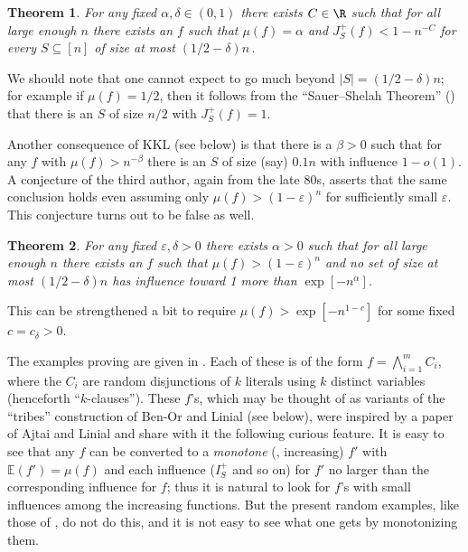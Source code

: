 \documentclass{toc}
\newtheorem{thm}{Theorem}[section]
\newcommand{\mn}[0]{\medskip\noindent}
\newcommand{\nin}[0]{\noindent}
\newcommand{\sub}[0]{\subseteq}
\newcommand{\0}[0]{\emptyset}
\newcommand{\ga}[0]{\alpha }
\newcommand{\gb}[0]{\beta }
\newcommand{\gd}[0]{\delta }
\newcommand{\eps}[0]{\varepsilon }
\begin{document}
%
\begin{thm}\label{prop1}
For any fixed $\ga,\gd \in (0,1)$
%
there exists $C\in\R$ such that for
all   %
large enough $n$
%
there exists 
%
%
%
%
an    %
$f$ such that  
$\mu(f) =\ga$ and $J_S^+(f)<1-n^{-C}$
for every $S\sub [n]$ of size %
%
at most $(1/2-\gd)n\,.$ 
%
%
\end{thm}

\nin
We should note that one cannot expect to go much
beyond $|S|=(1/2-\gd)n$; for example if $\mu(f)  =1/2$,
then it follows from the ``Sauer--Shelah Theorem''
() that there is
an $S$ of size $n/2$ with
$J_S^+(f) = 1$.

Another consequence of KKL (see  below)
is that there is a $\gb>0$ such that for any $f$ with $\mu(f) > n^{-\beta}$
there is an $S$ of size (say) $0.1 n$ with influence $1-o(1)$.
A conjecture of the third author, again from
the late 80s, asserts
that the same conclusion holds even assuming only
$\mu(f) > (1-\eps)^n$
for sufficiently small $\eps$.
This conjecture turns out to be false as well.  %


%
\begin{thm}\label{prop2}
For any fixed $\eps, \gd>0$
%
there exists $\ga > 0$ such that for all large enough $n$
%
there exists an $f$ %
%
such that
$\mu(f) > (1-\eps)^n$ and no set of %
%
size at most $(1/2-\gd)n$   %
%
has influence
%
toward   %
1 more than $\exp[-n^\ga]$.
\end{thm}


\mn
This can be strengthened a bit to require
$\mu(f)  > \exp[-n^{1-c}]$ for some fixed $c=c_\gd>0$.





The examples proving   
are given in .
Each of these is of the form %
$f= \bigwedge_{i=1}^m C_i$,  %
where the %
$C_i$  %
are random %
disjunctions %
of $k$ literals
using $k$ distinct variables (henceforth ``$k$-clauses'').
These $f$'s, %
%
which may be thought of as
variants of the ``tribes''
construction of Ben-Or and Linial
(see below),
were inspired by a paper of
Ajtai and Linial \cite {AL} and share with it the following
curious feature.
%
It is  %
easy to see that any $f$ can be converted to a
\emph{monotone}
(\ie, increasing) $f'$ with $\mathbb E (f')=\mu(f) $ and each
influence ($I_S^+$ and so on) for $f'$ no larger than
the corresponding influence for $f$;
thus %
it is  %
natural to look for $f$'s %
%
with small influences
among the increasing functions.
But the present random examples, like those of \cite{AL},
do not do this, and %
it is %
not easy to see what one gets by monotonizing them.
\end{document}
